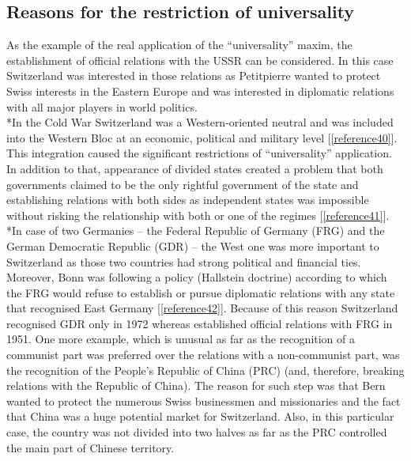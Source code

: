 \documentclass[a4paper]{article}
\begin{document}
\subsection{Reasons for the restriction of universality}
As the example of the real application of the “universality” maxim, the establishment of official relations with the USSR can be considered. In this case Switzerland was interested in those relations as Petitpierre wanted to protect Swiss interests in the Eastern Europe and was interested in diplomatic relations with all major players in world politics.
\\*In the Cold War Switzerland was a Western-oriented neutral and was included into the Western Bloc at an economic, political and military level [\ref{reference40}]. This integration caused the significant restrictions of “universality” application. In addition to that, appearance of divided states created a problem that both governments claimed to be the only rightful government of the state and establishing relations with both sides as independent states was impossible without risking the relationship with both or one of the regimes [\ref{reference41}].
\\*In case of two Germanies – the Federal Republic of Germany (FRG) and the German Democratic Republic (GDR) – the West one was more important to Switzerland as those two countries had strong political and financial ties. Moreover, Bonn was following a policy (Hallstein doctrine) according to which the FRG would refuse to establish or pursue diplomatic relations with any state that recognised East Germany [\ref{reference42}]. Because of this reason Switzerland recognised GDR only in 1972 whereas established official relations with FRG in 1951. One more example, which is unusual as far as the recognition of a communist part was preferred over the relations with a non-communist part, was the recognition of the People’s Republic of China (PRC) (and, therefore, breaking relations with the Republic of China). The reason for such step was that Bern wanted to protect the numerous Swiss businessmen and missionaries and the fact that China was a huge potential market for Switzerland. Also, in this particular case, the country was not divided into two halves as far as the PRC controlled the main part of Chinese territory.
\end{document}
